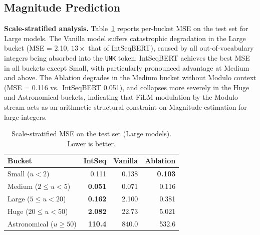 \subsection{Magnitude Prediction}
\label{sec:magnitude}

\textbf{Scale-stratified analysis.} Table~\ref{tab:scale} reports per-bucket MSE on the test
set for Large models. The Vanilla model suffers catastrophic degradation in the Large bucket
(MSE = 2.10, $13\times$ that of IntSeqBERT), caused by all out-of-vocabulary integers being
absorbed into the \texttt{UNK} token. IntSeqBERT achieves the best MSE in all buckets except
Small, with particularly pronounced advantage at Medium and above. The Ablation degrades in the
Medium bucket without Modulo context (MSE = 0.116 vs.\ IntSeqBERT 0.051), and collapses more
severely in the Huge and Astronomical buckets, indicating that FiLM modulation by the Modulo
stream acts as an arithmetic structural constraint on Magnitude estimation for large integers.

\begin{table}[t]
\caption{Scale-stratified MSE on the test set (Large models). Lower is better.}
\label{tab:scale}
\centering
\begin{tabular}{lrrr}
\hline
Bucket                   & IntSeq         & Vanilla & Ablation \\
\hline
Small ($u < 2$)          & 0.111          & 0.138   & \textbf{0.103} \\
Medium ($2 \leq u < 5$)  & \textbf{0.051} & 0.071   & 0.116   \\
Large ($5 \leq u < 20$)  & \textbf{0.162} & 2.100   & 0.381   \\
Huge ($20 \leq u < 50$)  & \textbf{2.082} & 22.73   & 5.021   \\
Astronomical ($u \geq 50$)& \textbf{110.4}& 840.0   & 532.6   \\
\hline
\end{tabular}
\end{table}

